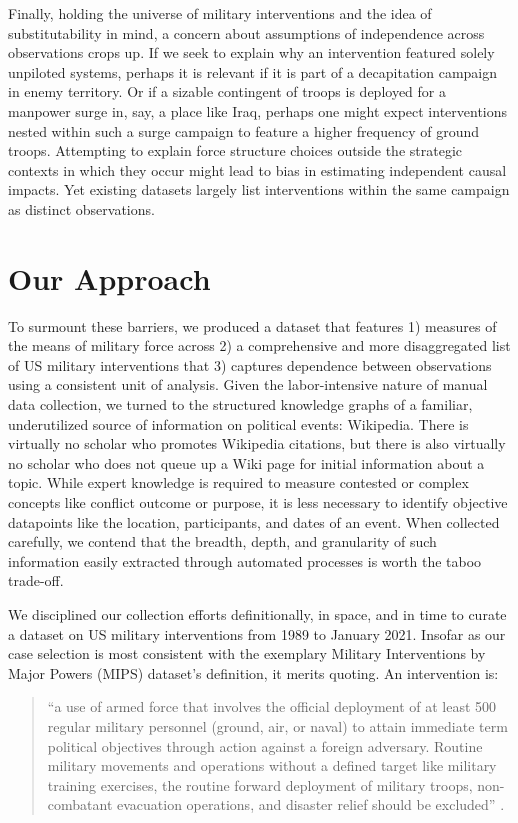 \documentclass[fleqn,12pt]{article}
\begin{document}
Finally, holding the universe of military interventions and the idea of substitutability in mind, a concern about assumptions of independence across observations crops up. If we seek to explain why an intervention featured solely unpiloted systems, perhaps it is relevant if it is part of a decapitation campaign in enemy territory. Or if a sizable contingent of troops is deployed for a manpower surge in, say, a place like Iraq, perhaps one might expect interventions nested within such a surge campaign to feature a higher frequency of ground troops. Attempting to explain force structure choices outside the strategic contexts in which they occur might lead to bias in estimating independent causal impacts. Yet existing datasets largely list interventions within the same campaign as distinct observations.

\section*{Our Approach}
To surmount these barriers, we produced a dataset that features 1) measures of the means of military force across 2) a comprehensive and more disaggregated list of US military interventions that 3) captures dependence between observations using a consistent unit of analysis. Given the labor-intensive nature of manual data collection, we turned to the structured knowledge graphs of a familiar, underutilized source of information on political events: Wikipedia. There is virtually no scholar who promotes Wikipedia citations, but there is also virtually no scholar who does not queue up a Wiki page for initial information about a topic. While expert knowledge is required to measure contested or complex concepts like conflict outcome or purpose, it is less necessary to identify objective datapoints like the location, participants, and dates of an event. When collected carefully, we contend that the breadth, depth, and granularity of such information easily extracted through automated processes is worth the taboo trade-off.

We disciplined our collection efforts definitionally, in space, and in time to curate a dataset on US military interventions from 1989 to January 2021. Insofar as our case selection is most consistent with the exemplary Military Interventions by Major Powers (MIPS) dataset’s definition, it merits quoting. An intervention is: 

\begin{quote}\singlespacing
``a use of armed force that involves the official deployment of at least 500 regular military personnel (ground, air, or naval) to attain immediate term political objectives through action against a foreign adversary. Routine military movements and operations without a defined target like military training exercises, the routine forward deployment of military troops, non-combatant evacuation operations, and disaster relief should be excluded” \citep[][3]{sullivan_militaryinterventionpowerful_2009}. 
\end{quote}
\end{document}
